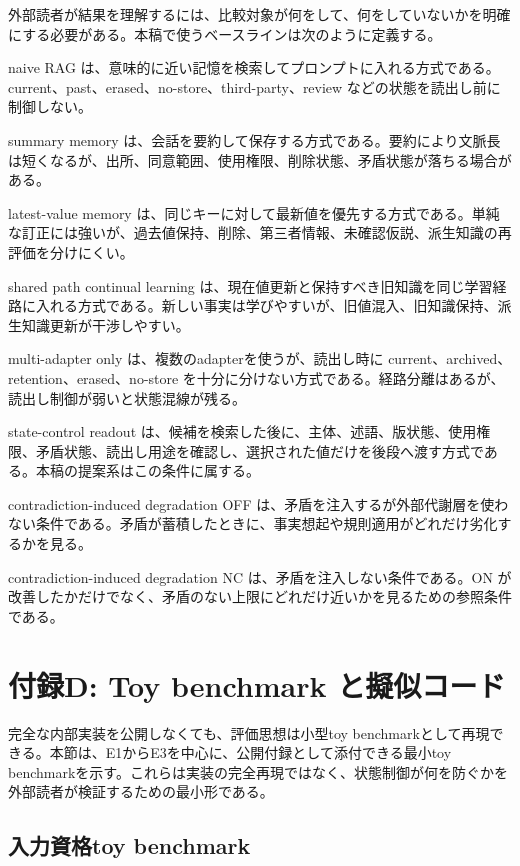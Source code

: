 \documentclass[12pt,a4paper]{article}
\begin{document}
外部読者が結果を理解するには、比較対象が何をして、何をしていないかを明確にする必要がある。本稿で使うベースラインは次のように定義する。

naive RAG は、意味的に近い記憶を検索してプロンプトに入れる方式である。current、past、erased、no-store、third-party、review などの状態を読出し前に制御しない。

summary memory は、会話を要約して保存する方式である。要約により文脈長は短くなるが、出所、同意範囲、使用権限、削除状態、矛盾状態が落ちる場合がある。

latest-value memory は、同じキーに対して最新値を優先する方式である。単純な訂正には強いが、過去値保持、削除、第三者情報、未確認仮説、派生知識の再評価を分けにくい。

shared path continual learning は、現在値更新と保持すべき旧知識を同じ学習経路に入れる方式である。新しい事実は学びやすいが、旧値混入、旧知識保持、派生知識更新が干渉しやすい。

multi-adapter only は、複数のadapterを使うが、読出し時に current、archived、retention、erased、no-store を十分に分けない方式である。経路分離はあるが、読出し制御が弱いと状態混線が残る。

state-control readout は、候補を検索した後に、主体、述語、版状態、使用権限、矛盾状態、読出し用途を確認し、選択された値だけを後段へ渡す方式である。本稿の提案系はこの条件に属する。

contradiction-induced degradation OFF は、矛盾を注入するが外部代謝層を使わない条件である。矛盾が蓄積したときに、事実想起や規則適用がどれだけ劣化するかを見る。

contradiction-induced degradation NC は、矛盾を注入しない条件である。ON が改善したかだけでなく、矛盾のない上限にどれだけ近いかを見るための参照条件である。

\section{付録D: Toy benchmark と擬似コード}\label{ux4ed8ux9332d-toy-benchmark-ux3068ux64ecux4f3cux30b3ux30fcux30c9}

完全な内部実装を公開しなくても、評価思想は小型toy benchmarkとして再現できる。本節は、E1からE3を中心に、公開付録として添付できる最小toy benchmarkを示す。これらは実装の完全再現ではなく、状態制御が何を防ぐかを外部読者が検証するための最小形である。

\subsection{入力資格toy benchmark}\label{ux5165ux529bux8cc7ux683ctoy-benchmark}
\end{document}
